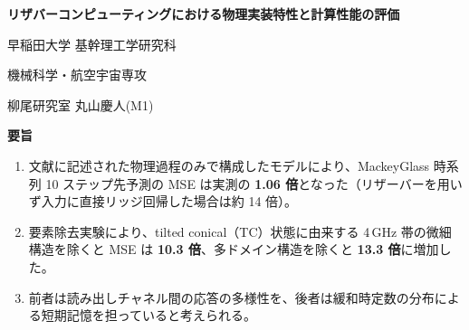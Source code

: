 \documentclass{article}
\newcommand\rTC{10.3}     %
\newcommand\rMD{13.3}     %
\newcommand\gapfull{1.06}   %
\newcommand\MSEexp{3.70}  \newcommand\MCexp{4.94}  \newcommand\NLexp{0.550} \newcommand\CPexp{1.77}
\newcommand\MSEnores{52}     %
\newcommand\gapnores{14}     %
\newcommand\subheadfont{\fontsize{24}{30}\selectfont\bfseries}
\newcommand\key[1]{\textbf{\color{cAcc}#1}}
\newlength\gap   \setlength\gap{4mm}
\newcommand\vgap{\par\vspace{2mm}}
\begin{document}

\begin{tcolorbox}[enhanced, colback=cMain, colframe=cMain, arc=4mm,
  left=18mm, right=14mm, top=9mm, bottom=9mm, coltext=white]
\begin{minipage}[c]{\dimexpr\linewidth-150mm}
  {\fontsize{56}{67}\selectfont\bfseries リザバーコンピューティングにおける物理実装特性と計算性能の評価\par}
\end{minipage}\hfill
\begin{minipage}[c]{140mm}\raggedleft
  {\fontsize{28}{36}\selectfont 早稲田大学 基幹理工学研究科\par}
  {\fontsize{28}{36}\selectfont 機械科学・航空宇宙専攻 \par}
  {\fontsize{28}{36}\selectfont 柳尾研究室 丸山慶人(M1)\par}
  \vspace{3mm}
\end{minipage}
\end{tcolorbox}
\vgap

\begin{tcolorbox}[enhanced, colback=cLight, colframe=cMain, boxrule=1.5pt, arc=4mm,
  left=12mm, right=12mm, top=6mm, bottom=6mm]
{\subheadfont\color{cMain}要旨\par}\vspace{2mm}
\begin{enumerate}
  \item 文献に記述された物理過程のみで構成したモデルにより、Mackey\textendash{}Glass 時系列 10 ステップ先予測の MSE は実測の \key{\gapfull{} 倍}となった（リザーバーを用いず入力に直接リッジ回帰した場合は約 \gapnores{} 倍）。
  \item 要素除去実験により、tilted conical（TC）状態に由来する 4\,GHz 帯の微細構造を除くと MSE は \key{\rTC{} 倍}、多ドメイン構造を除くと \key{\rMD{} 倍}に増加した。
  \item 前者は読み出しチャネル間の応答の多様性を、後者は緩和時定数の分布による短期記憶を担っていると考えられる。
\end{enumerate}
\end{tcolorbox}
\vgap
\end{document}

